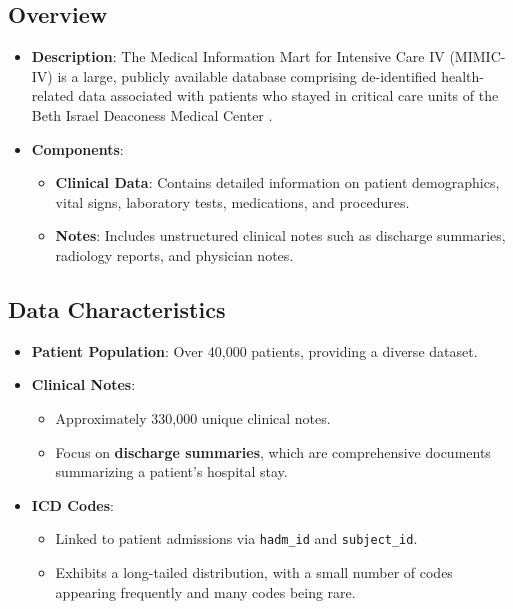 \documentclass[12pt,a4paper]{report}
\begin{document}
\subsection{Overview}
\begin{itemize}
    \item \textbf{Description}: The Medical Information Mart for Intensive Care IV (MIMIC-IV) is a large, publicly available database comprising de-identified health-related data associated with patients who stayed in critical care units of the Beth Israel Deaconess Medical Center \cite{johnson2016mimic}.
    \item \textbf{Components}:
    \begin{itemize}
        \item \textbf{Clinical Data}: Contains detailed information on patient demographics, vital signs, laboratory tests, medications, and procedures.
        \item \textbf{Notes}: Includes unstructured clinical notes such as discharge summaries, radiology reports, and physician notes.
    \end{itemize}
\end{itemize}

\subsection{Data Characteristics}
\begin{itemize}
    \item \textbf{Patient Population}: Over 40,000 patients, providing a diverse dataset.
    \item \textbf{Clinical Notes}:
    \begin{itemize}
        \item Approximately 330,000 unique clinical notes.
        \item Focus on \textbf{discharge summaries}, which are comprehensive documents summarizing a patient's hospital stay.
    \end{itemize}
    \item \textbf{ICD Codes}:
    \begin{itemize}
        \item Linked to patient admissions via \texttt{hadm\_id} and \texttt{subject\_id}.
        \item Exhibits a long-tailed distribution, with a small number of codes appearing frequently and many codes being rare.
    \end{itemize}
\end{itemize}
\end{document}
